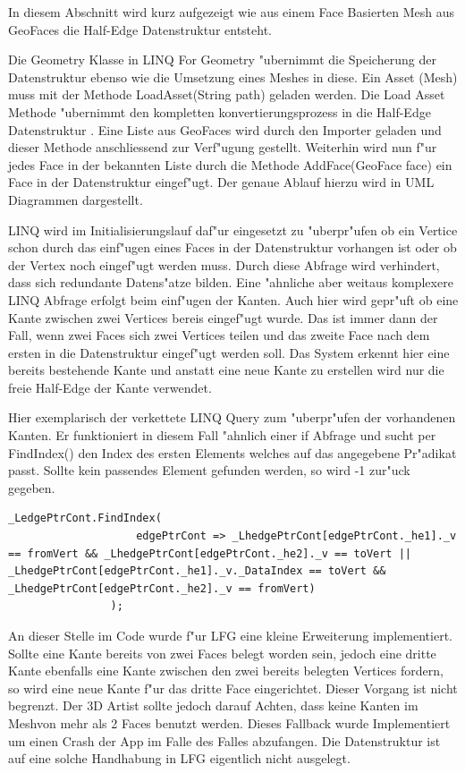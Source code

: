\documentclass[pagesize, paper=a4, fontsize=12pt,titlepage=true, headings=small, headnosepline, abstractoff, liststotoc, nochapterprefix, plainheadsepline]{scrreprt}
\newcommand{\LFGS}{LINQ For Geometry }
\newcommand{\HES}{Half-Edge Datenstruktur }
\begin{document}
			In diesem Abschnitt wird kurz aufgezeigt wie aus einem Face Basierten Mesh aus GeoFaces die \HES entsteht.

Die Geometry Klasse in \LFGS "ubernimmt die Speicherung der Datenstruktur ebenso wie die Umsetzung eines Meshes in diese. Ein Asset (Mesh) muss mit der Methode LoadAsset(String path) geladen werden. Die Load Asset Methode "ubernimmt den kompletten konvertierungsprozess in die \HES. Eine Liste aus GeoFaces wird durch den Importer geladen und dieser Methode anschliessend zur Verf"ugung gestellt. Weiterhin wird nun f"ur jedes Face in der bekannten Liste durch die Methode AddFace(GeoFace face) ein Face in der Datenstruktur eingef"ugt. Der genaue Ablauf hierzu wird in UML Diagrammen dargestellt.

LINQ wird im Initialisierungslauf daf"ur eingesetzt zu "uberpr"ufen ob ein Vertice schon durch das einf"ugen eines Faces in der Datenstruktur vorhangen ist oder ob der Vertex noch eingef"ugt werden muss. Durch diese Abfrage wird verhindert, dass sich redundante Datens"atze bilden. Eine "ahnliche aber weitaus komplexere LINQ Abfrage erfolgt beim einf"ugen der Kanten. Auch hier wird gepr"uft ob eine Kante zwischen zwei Vertices bereis eingef"ugt wurde. Das ist immer dann der Fall, wenn zwei Faces sich zwei Vertices teilen und das zweite Face nach dem ersten in die Datenstruktur eingef"ugt werden soll. Das System erkennt hier eine bereits bestehende Kante und anstatt eine neue Kante zu erstellen wird nur die freie Half-Edge der Kante verwendet.
\newline

Hier exemplarisch der verkettete LINQ Query zum "uberpr"ufen der vorhandenen Kanten. Er funktioniert in diesem Fall "ahnlich einer if Abfrage und sucht per FindIndex() den Index des ersten Elements welches auf das angegebene Pr"adikat passt. Sollte kein passendes Element gefunden werden, so wird -1 zur"uck gegeben.

\begin{lstlisting}
_LedgePtrCont.FindIndex(
                    edgePtrCont => _LhedgePtrCont[edgePtrCont._he1]._v == fromVert && _LhedgePtrCont[edgePtrCont._he2]._v == toVert || _LhedgePtrCont[edgePtrCont._he1]._v._DataIndex == toVert && _LhedgePtrCont[edgePtrCont._he2]._v == fromVert)
                );
\end{lstlisting}

An dieser Stelle im Code wurde f"ur LFG eine kleine Erweiterung implementiert. Sollte eine Kante bereits von zwei Faces belegt worden sein, jedoch eine dritte Kante ebenfalls eine Kante zwischen den zwei bereits belegten Vertices fordern, so wird eine neue Kante f"ur das dritte Face eingerichtet. Dieser Vorgang ist nicht begrenzt. Der 3D Artist sollte jedoch darauf Achten, dass keine Kanten im Meshvon mehr als 2 Faces benutzt werden. Dieses Fallback wurde Implementiert um einen Crash der App im Falle des Falles abzufangen. Die Datenstruktur ist auf eine solche Handhabung in LFG eigentlich nicht ausgelegt.
\end{document}
